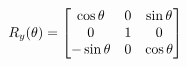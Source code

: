 \documentclass[preview]{standalone}
\begin{document}
\begin{align*}
\special{dvisvgm:raw <g id='unique000'>}R_{y}(\theta) = \begin{bmatrix} \cos\theta & 0 & \sin\theta \\ 0 & 1 & 0 \\ -\sin\theta & 0 & \cos\theta \end{bmatrix}\special{dvisvgm:raw </g>}
\end{align*}
\end{document}
